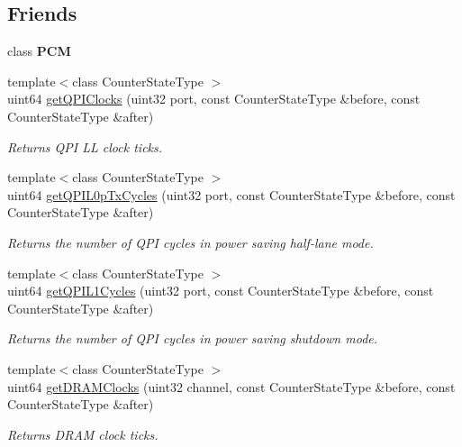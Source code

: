 \subsection*{Friends}
\begin{DoxyCompactItemize}
\item 
\mbox{\label{class_server_uncore_power_state_ab5f56d2e95ba3daf52c17b8a1d356d64}} 
class {\bfseries P\+CM}
\item 
{\footnotesize template$<$class Counter\+State\+Type $>$ }\\uint64 \mbox{\hyperlink{class_server_uncore_power_state_af7d9ba0936d7c305d0cc6c2db296a336}{get\+Q\+P\+I\+Clocks}} (uint32 port, const Counter\+State\+Type \&before, const Counter\+State\+Type \&after)
\begin{DoxyCompactList}\small\item\em Returns Q\+PI LL clock ticks. \end{DoxyCompactList}\item 
{\footnotesize template$<$class Counter\+State\+Type $>$ }\\uint64 \mbox{\hyperlink{class_server_uncore_power_state_acdac5d9d7a5a6496d90b0681badc26b3}{get\+Q\+P\+I\+L0p\+Tx\+Cycles}} (uint32 port, const Counter\+State\+Type \&before, const Counter\+State\+Type \&after)
\begin{DoxyCompactList}\small\item\em Returns the number of Q\+PI cycles in power saving half-\/lane mode. \end{DoxyCompactList}\item 
{\footnotesize template$<$class Counter\+State\+Type $>$ }\\uint64 \mbox{\hyperlink{class_server_uncore_power_state_a580ae4e465d0f8dd93935ad7af28c095}{get\+Q\+P\+I\+L1\+Cycles}} (uint32 port, const Counter\+State\+Type \&before, const Counter\+State\+Type \&after)
\begin{DoxyCompactList}\small\item\em Returns the number of Q\+PI cycles in power saving shutdown mode. \end{DoxyCompactList}\item 
{\footnotesize template$<$class Counter\+State\+Type $>$ }\\uint64 \mbox{\hyperlink{class_server_uncore_power_state_aeb1baf7feb391c0512dc378a9fd66a17}{get\+D\+R\+A\+M\+Clocks}} (uint32 channel, const Counter\+State\+Type \&before, const Counter\+State\+Type \&after)
\begin{DoxyCompactList}\small\item\em Returns D\+R\+AM clock ticks. \end{DoxyCompactList}\item 

\end{DoxyCompactItemize}
